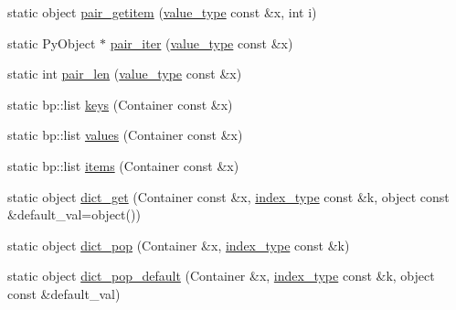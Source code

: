 \begin{DoxyCompactItemize}
\item 
static object \hyperlink{classboost_1_1python_1_1std__map__indexing__suite_a802d62d636e685954b7abe3331de7af6}{pair\+\_\+getitem} (\hyperlink{classboost_1_1python_1_1std__map__indexing__suite_aff9ed68cf30e805a04a313d92c62ab38}{value\+\_\+type} const \&x, int i)
\item 
static Py\+Object $\ast$ \hyperlink{classboost_1_1python_1_1std__map__indexing__suite_a09b84169bb3b2ceb9c576c41cd63280e}{pair\+\_\+iter} (\hyperlink{classboost_1_1python_1_1std__map__indexing__suite_aff9ed68cf30e805a04a313d92c62ab38}{value\+\_\+type} const \&x)
\item 
static int \hyperlink{classboost_1_1python_1_1std__map__indexing__suite_a639bbbf3265c0cab8419b106590c3857}{pair\+\_\+len} (\hyperlink{classboost_1_1python_1_1std__map__indexing__suite_aff9ed68cf30e805a04a313d92c62ab38}{value\+\_\+type} const \&x)
\item 
static bp\+::list \hyperlink{classboost_1_1python_1_1std__map__indexing__suite_a1d08ce35eb71bc9248f64a515d6d9775}{keys} (Container const \&x)
\item 
static bp\+::list \hyperlink{classboost_1_1python_1_1std__map__indexing__suite_a81c04a5902c3ea0b559b56ab66e600a9}{values} (Container const \&x)
\item 
static bp\+::list \hyperlink{classboost_1_1python_1_1std__map__indexing__suite_a6e44b3f64f0723b75c7e00b8d46bab92}{items} (Container const \&x)
\item 
static object \hyperlink{classboost_1_1python_1_1std__map__indexing__suite_a6012daef85763e30ed55ef753933ff1b}{dict\+\_\+get} (Container const \&x, \hyperlink{classboost_1_1python_1_1std__map__indexing__suite_a4b2ac75883fba93dbca6d9e83197c842}{index\+\_\+type} const \&k, object const \&default\+\_\+val=object())
\item 
static object \hyperlink{classboost_1_1python_1_1std__map__indexing__suite_a56d69ee32c136ed83389eefae5f8df3a}{dict\+\_\+pop} (Container \&x, \hyperlink{classboost_1_1python_1_1std__map__indexing__suite_a4b2ac75883fba93dbca6d9e83197c842}{index\+\_\+type} const \&k)
\item 
static object \hyperlink{classboost_1_1python_1_1std__map__indexing__suite_a923cb4bd1266dd53065eba4d3c91279a}{dict\+\_\+pop\+\_\+default} (Container \&x, \hyperlink{classboost_1_1python_1_1std__map__indexing__suite_a4b2ac75883fba93dbca6d9e83197c842}{index\+\_\+type} const \&k, object const \&default\+\_\+val)
\item 

\end{DoxyCompactItemize}
